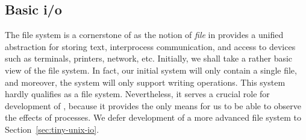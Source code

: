 \documentclass[12pt,phd,lfcs,twoside,openright,logo,leftchapter,normalheadings]{infthesis}
\theoremstyle{plain}
\theoremstyle{definition}
\begin{document}
\subsection{Basic i/o}
\label{sec:tiny-unix-bio}

The file system is a cornerstone of \UNIX{} as the notion of \emph{file}
in \UNIX{} provides a unified abstraction for storing text, interprocess
communication, and access to devices such as terminals, printers,
network, etc.
%
Initially, we shall take a rather basic view of the file system. In
fact, our initial system will only contain a single file, and
moreover, the system will only support writing operations. This system
hardly qualifies as a \UNIX{} file system. Nevertheless, it serves a
crucial role for development of \OSname{}, because it provides the
only means for us to be able to observe the effects of processes.
%
We defer development of a more advanced file system to
Section~\ref{sec:tiny-unix-io}.
\end{document}
